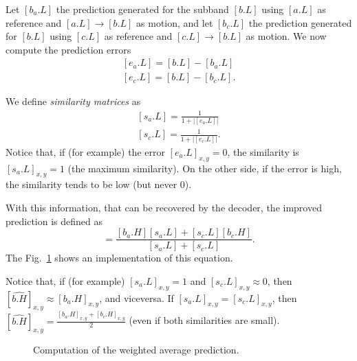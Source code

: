 Let $[b_a.L]$ the prediction generated for the subband $[b.L]$ using
$[a.L]$ as reference and $[a.L]\rightarrow [b.L]$ as motion, and let
$[b_c.L]$ the prediction generated for $[b.L]$ using $[c.L]$ as
reference and $[c.L]\rightarrow [b.L]$ as motion. We now compute the
prediction errors
\begin{equation}
  \begin{array}{l}
    {[e_a.L]} = [b.L] - [b_a.L]\\
    {[e_c.L]} = [b.L] - [b_c.L].
  \end{array}
\end{equation}

We define \emph{similarity matrices} as
\begin{equation}
  \begin{array}{l}
    {[s_a.L]} = \frac{1}{1+{|[e_a.L]|}}\\
    {[s_c.L]} = \frac{1}{1+{|[e_c.L]|}}.    
  \end{array}
  \label{eq:weighted_prediction}
\end{equation}
Notice that, if (for example) the error $[e_a.L]_{x,y}=0$, the
similarity is $[s_a.L]_{x,y}=1$ (the maximum similarity). On the other
side, if the error is high, the similarity tends to be low (but never
$0$).

With this information, that can be recovered by the decoder, the
improved prediction is defined as
\begin{equation}
  [\hat{b.H}] = \frac{[b_a.H][s_a.L]+[s_c.L][b_c.H]}{[s_a.L]+[s_c.L]}.
\end{equation}
The Fig.~\ref{fig:weighted_average} shows an implementation of this
equation.

Notice that, if (for example) $[s_a.L]_{x,y}=1$ and
$[s_c.L]_{x,y}\approx 0$, then
$[\hat{b.H}]_{x,y} \approx [b_a.H]_{x,y}$, and viceversa. If
$[s_a.L]_{x,y}=[s_c.L]_{x,y}$, then
$[\hat{b.H}]_{x,y}=\frac{[b_a.H]_{x,y}+[b_c.H]_{x,y}}{2}$ (even if both similarities are small).

\begin{figure}
  \centering 
  \caption{Computation of the weighted average prediction.}
  \label{fig:weighted_average}
\end{figure}




